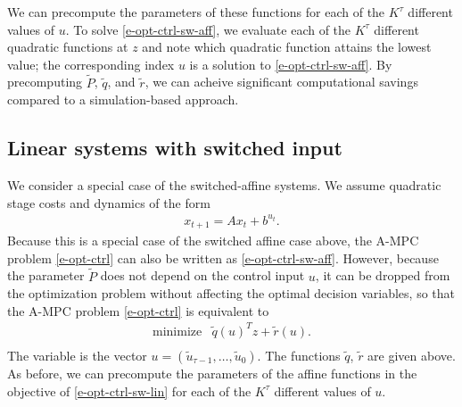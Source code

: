 \documentclass[12pt]{article}
\begin{document}
We can precompute the parameters of these functions
for each of the $K^\tau$ different values of $u$.
To solve \eqref{e-opt-ctrl-sw-aff},
we evaluate each of the $K^\tau$ different quadratic functions at $z$
and note which quadratic function attains the lowest value;
the corresponding index $u$ is a solution to 
\eqref{e-opt-ctrl-sw-aff}.
By precomputing $\tilde P$, $\tilde q$, and $\tilde r$,
we can acheive significant computational savings
compared to a simulation-based approach.


\subsection{Linear systems with switched input}
We consider a special case of the switched-affine systems.
We assume quadratic stage costs and dynamics of the form
\begin{align}
\label{e-lin-sys-sw-input}
x_{t+1} = Ax_t + b^{u_t}.
\end{align}
Because this is a special case of the switched affine case above,
the A-MPC problem \eqref{e-opt-ctrl}
can also be written as \eqref{e-opt-ctrl-sw-aff}.
However, because the parameter $\tilde P$ does not depend on the control input $u$,
it can be dropped from the optimization problem 
without affecting the optimal decision variables,
so that the A-MPC problem \eqref{e-opt-ctrl} is equivalent to
\begin{equation}
\begin{array}{ll}
\mbox{minimize} &  
  \tilde q(u)^T z + \tilde r(u). \\
\end{array}
\label{e-opt-ctrl-sw-lin}
\end{equation}
The variable is the vector 
$u = (\tilde u_{\tau-1}, \ldots, \tilde u_0)$.
The functions $\tilde q$, $\tilde r$ are given above.
As before, we can precompute the parameters of the affine functions
in the objective of \eqref{e-opt-ctrl-sw-lin}
for each of the $K^\tau$ different values of $u$.
\end{document}
